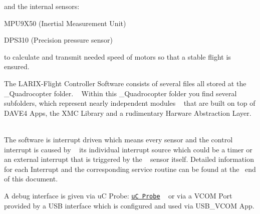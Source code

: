 and the internal sensors\+:
\begin{DoxyItemize}
\item M\+P\+U9\+X50 (Inertial Measurement Unit)
\item D\+P\+S310 (Precision pressure sensor)
\end{DoxyItemize}

to calculate and transmit needed speed of motors so that a stable flight is ensured. ~\newline


The L\+A\+R\+I\+X-\/\+Flight Controller Software consists of several files all stored at the \+\_\+\+Quadrocopter folder. ~\newline
 Within this \+\_\+\+Quadrocopter folder you find several subfolders, which represent nearly independent modules ~\newline
 that are built on top of D\+A\+V\+E4 Apps, the X\+MC Library and a rudimentary Harware Abstraction Layer. ~\newline


The software is interrupt driven which means every sensor and the control interrupt is caused by ~\newline
 it\textquotesingle{}s individual interrupt source which could be a timer or an external interrupt that is triggered by the ~\newline
 sensor itself. Detailed information for each Interrupt and the corresponding service routine can be found at the~\newline
 end of this document. ~\newline


A debug interface is given via uC Probe\+: \href{http://www.infineon.com/cms/de/product/microcontroller/development-tools-software-and-kits/dave-version-4-free-development-platform-for-code-generation/uc-probe-xmc-for-industrial-mcu/channel.html?channel=5546d46254e133b40154f34038fe1620#ispnTab1}{\tt uC Probe} ~\newline
 or via a V\+C\+OM Port provided by a U\+SB interface which is configured and used via U\+S\+B\+\_\+\+V\+C\+OM App.

